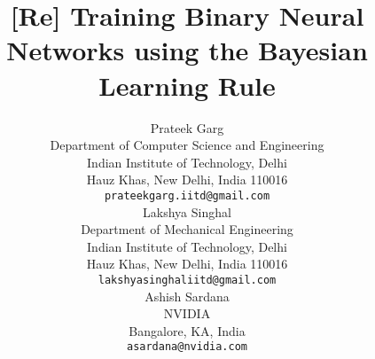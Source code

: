 \documentclass{article}
\title{[Re] Training Binary Neural Networks using the Bayesian Learning Rule}
\author{
  Prateek Garg\\
  Department of Computer Science and Engineering\\
  Indian Institute of Technology, Delhi\\
  Hauz Khas, New Delhi, India 110016 \\
  \texttt{prateekgarg.iitd@gmail.com} \\
  
   \And
   Lakshya Singhal \\
   Department of Mechanical Engineering \\
   Indian Institute of Technology, Delhi\\
   Hauz Khas, New Delhi, India 110016 \\
  \texttt{lakshyasinghaliitd@gmail.com} \\
  
   \AND
   Ashish Sardana \\
   NVIDIA \\
   Bangalore, KA, India \\
   \texttt{asardana@nvidia.com} \\
}
\begin{document}
\maketitle


\nocite{*}





\end{document}
